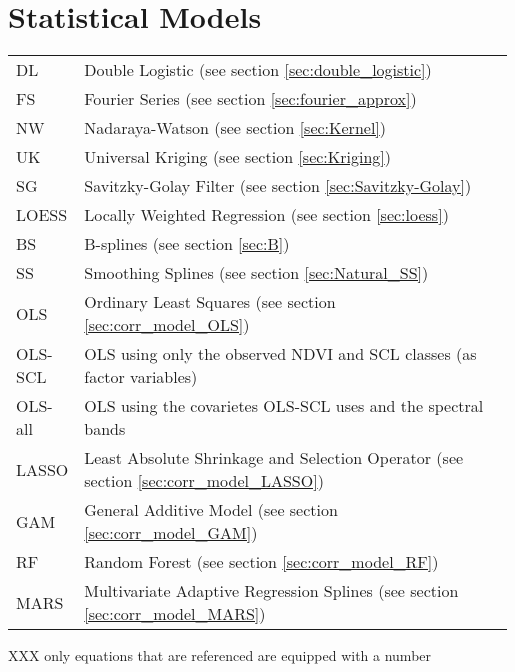 \section*{Statistical Models}
\begin{longtable}{p{0.12\linewidth} p{0.87\linewidth}}
	DL
		& Double Logistic (see section \ref{sec:double_logistic})\\
	FS
		& Fourier Series (see section \ref{sec:fourier_approx})\\
	NW
		& Nadaraya-Watson (see section \ref{sec:Kernel})\\
	UK
		& Universal Kriging (see section \ref{sec:Kriging})\\
	SG
		& Savitzky-Golay Filter (see section \ref{sec:Savitzky-Golay})\\
	LOESS
		& Locally Weighted Regression (see section \ref{sec:loess})\\
	BS
		& B-splines (see section \ref{sec:B})\\
	SS
		& Smoothing Splines (see section \ref{sec:Natural_SS})\\
	OLS
		& Ordinary Least Squares (see section \ref{sec:corr_model_OLS})\\
	OLS-SCL
		& OLS using only the observed NDVI and SCL classes (as factor variables)\\
	OLS-all
		& OLS using the covarietes OLS-SCL uses and the spectral bands\\
	LASSO
		& Least Absolute Shrinkage and Selection Operator (see section \ref{sec:corr_model_LASSO})\\
	GAM
		& General Additive Model (see section \ref{sec:corr_model_GAM})\\
	RF
		& Random Forest (see section \ref{sec:corr_model_RF})\\
	MARS
		& Multivariate Adaptive Regression Splines (see section \ref{sec:corr_model_MARS})\\
\end{longtable} \renewcommand{\arraystretch}{1}


XXX only equations that are referenced are equipped with a number











